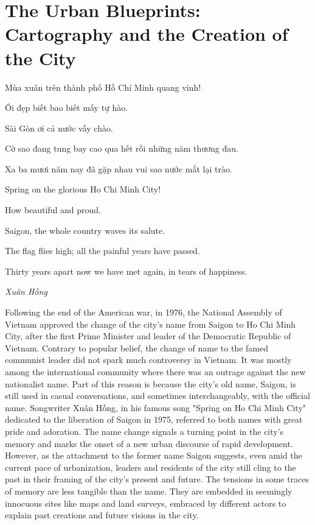 \chapter[The Urban Blueprints]{The Urban Blueprints: Cartography and the Creation of the City}\label{cartography}
\setlength{\epigraphwidth}{4in}
\begin{minipage}{\textwidth}
\epigraph{\vi Mùa xuân trên thành phố Hồ Chí Minh quang vinh!

Ôi đẹp biết bao biết mấy tự hào.

Sài Gòn ơi cả nước vẫy chào.

Cờ sao đang tung bay cao qua hết rồi những năm thương đau.

Xa ba mươi năm nay đã gặp nhau vui sao nước mắt lại trào.

\vspace{.1 in}
Spring on the glorious Ho Chi Minh City!

How beautiful and proud.

Saigon, the whole country waves its salute.

The flag flies high; all the painful years have passed.

Thirty years apart now we have met again, in tears of happiness.}{\vi \textit{Xuân Hồng}}
\end{minipage}
\vi
Following the end of the American war, in 1976, the National Assembly of Vietnam approved the change of the city's name from Saigon to Ho Chi Minh City, after the first Prime Minister and leader of the Democratic Republic of Vietnam. Contrary to popular belief, the change of name to the famed communist leader did not spark much controversy in Vietnam. It was mostly among the international community where there was an outrage against the new nationalist name. Part of this reason is because the city's old name, Saigon, is still used in casual conversations, and sometimes interchangeably, with the official name. Songwriter Xuân Hồng, in his famous song "Spring on Ho Chi Minh City" dedicated to the liberation of Saigon in 1975, referred to both names with great pride and adoration. The name change signals a turning point in the city's memory and marks the onset of a new urban discourse of rapid development. However, as the attachment to the former name Saigon suggests, even amid the current pace of urbanization, leaders and residents of the city still cling to the past in their framing of the city's present and future. The tensions in some traces of memory are less tangible than the name. They are embedded in seemingly innocuous sites like maps and land surveys, embraced by different actors to explain past creations and future visions in the city.

